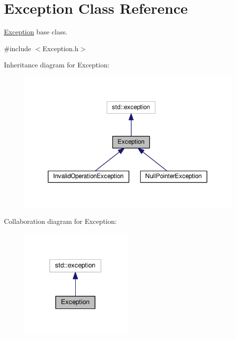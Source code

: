 \hypertarget{classException}{}\section{Exception Class Reference}
\label{classException}


\hyperlink{classException}{Exception} base class.  




{\ttfamily \#include $<$Exception.\+h$>$}



Inheritance diagram for Exception\+:
\nopagebreak
\begin{figure}[H]
\begin{center}
\leavevmode
\includegraphics[width=338pt]{classException__inherit__graph}
\end{center}
\end{figure}


Collaboration diagram for Exception\+:
\nopagebreak
\begin{figure}[H]
\begin{center}
\leavevmode
\includegraphics[width=158pt]{classException__coll__graph}
\end{center}
\end{figure}
